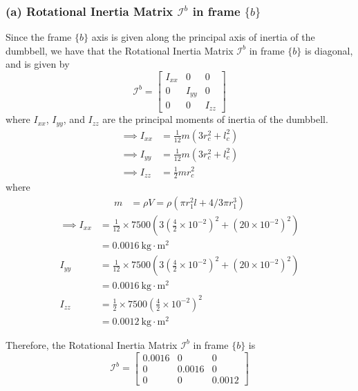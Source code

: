 \subsubsection*{(a) Rotational Inertia Matrix \( \mathcal{I}^{b} \) in frame \( \{b\} \)}

Since the frame \( \{b\} \) axis is given along the principal axis of inertia of the dumbbell, we have that the Rotational Inertia Matrix \( \mathcal{I}^{b} \) in frame \( \{b\} \) is diagonal, and is given by
\begin{equation}
    \mathcal{I}^{b}=\begin{bmatrix}
        I_{xx} & 0      & 0      \\
        0      & I_{yy} & 0      \\
        0      & 0      & I_{zz}
    \end{bmatrix}
\end{equation}
where \( I_{xx} \), \( I_{yy} \), and \( I_{zz} \) are the principal moments of inertia of the dumbbell.
\begin{align}
    \implies
    I_{xx}
     & =
    \frac{1}{12} m\left(3 r_{c}^{2}+l_c^{2}\right)
    \\
    \implies
    I_{yy}
     & =
    \frac{1}{12} m\left(3 r_{c}^{2}+l_c^{2}\right)
    \\
    \implies
    I_{zz}
     & =
    \frac{1}{2} m r_{c}^{2}
\end{align}
where
\begin{align*}
    m
     & =
    \rho V
    =
    \rho
    \left(\pi r_{1}^{2} l+4 / 3 \pi r_{1}^{3}\right)
\end{align*}
\begin{align*}
    \implies
    I_{xx}
     & =
    \frac{1}{12} \times 7500\left(3\left(\frac{4}{2} \times 10^{-2}\right)^{2}+\left(20 \times 10^{-2}\right)^{2}\right)
    \\ & =
    0.0016 \mathrm{~kg} \cdot \mathrm{m}^{2}
    \\
    I_{yy}
     & =
    \frac{1}{12} \times 7500\left(3\left(\frac{4}{2} \times 10^{-2}\right)^{2}+\left(20 \times 10^{-2}\right)^{2}\right)
    \\ & =
    0.0016 \mathrm{~kg} \cdot \mathrm{m}^{2}
    \\
    I_{zz}
     & =
    \frac{1}{2} \times 7500\left(\frac{4}{2} \times 10^{-2}\right)^{2}
    \\ & =
    0.0012 \mathrm{~kg} \cdot \mathrm{m}^{2}
\end{align*}

Therefore, the Rotational Inertia Matrix \( \mathcal{I}^{b} \) in frame \( \{b\} \) is
\begin{equation}
    \boxed{
        \mathcal{I}^{b}
        =
        \begin{bmatrix}
            0.0016 & 0      & 0      \\
            0      & 0.0016 & 0      \\
            0      & 0      & 0.0012
        \end{bmatrix}
    }
\end{equation}

